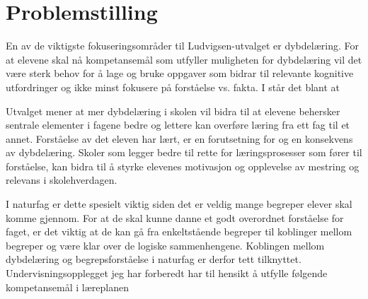 \documentclass[main.tex]{subfiles}
\begin{document}
\section*{Problemstilling}
En av de viktigste fokuseringsområder til Ludvigsen-utvalget er dybdelæring. For at elevene
skal nå kompetansemål som utfyller muligheten for dybdelæring vil det være sterk behov for å lage og bruke 
oppgaver som bidrar til relevante kognitive utfordringer og ikke minst fokusere på forståelse vs. fakta. 
I  står det blant at

\begin{displayquote}
Utvalget mener at mer dybdelæring i skolen vil bidra til at elevene behersker sentrale elementer
i fagene bedre og lettere kan overføre læring fra ett fag til et annet. Forståelse av det eleven har
lært, er en forutsetning for og en konsekvens av dybdelæring. Skoler som legger bedre til rette for
læringsprosesser som fører til forståelse, kan bidra til å styrke elevenes motivasjon og opplevelse
av mestring og relevans i skolehverdagen.
\end{displayquote}
I naturfag er dette spesielt viktig siden det er veldig mange begreper elever skal komme gjennom. For at de skal
kunne danne et godt overordnet forståelse for faget, er det viktig at de kan gå fra enkeltstående begreper til 
koblinger mellom begreper og være klar over de logiske sammenhengene. Koblingen mellom dybdelæring og 
begrepsforståelse i naturfag er derfor tett tilknyttet.
\newline
\newline
Undervisningsopplegget jeg har forberedt har til hensikt å utfylle følgende kompetansemål  i læreplanen
\end{document}
